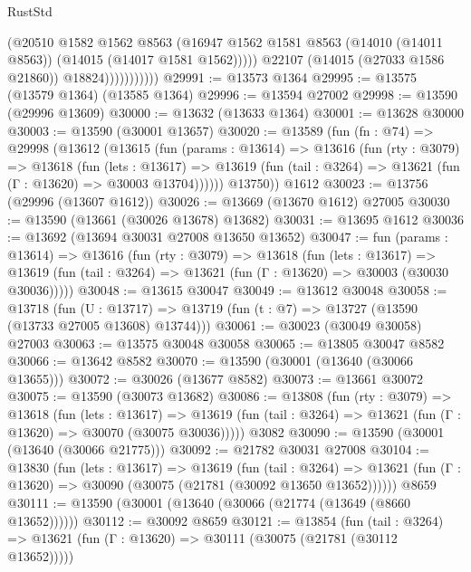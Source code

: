 \begin{lexlean}{RustStd}
\begin{coremodule}
                            (@20510
                              @1582
                              @1562
                              @8563
                              (@16947
                                @1562
                                @1581
                                @8563
                                (@14010 (@14011 @8563))
                                (@14015 (@14017 @1581 @1562)))))
                          @22107
                          (@14015 (@27033 @1586 @21860))
                          @18824)))))))))))
@29991 := @13573 @1364
@29995 := @13575 (@13579 @1364) (@13585 @1364)
@29996 := @13594 @27002
@29998 := @13590 (@29996 @13609)
@30000 := @13632 (@13633 @1364)
@30001 := @13628 @30000
@30003 := @13590 (@30001 @13657)
@30020 := @13589
    (fun (fn : @74) =>
    @29998
      (@13612
        (@13615
          (fun (params : @13614) =>
          @13616
            (fun (rty : @3079) =>
            @13618
              (fun (lets : @13617) =>
              @13619 (fun (tail : @3264) => @13621 (fun (Γ : @13620) => @30003 @13704))))))
        @13750))
    @1612
@30023 := @13756 (@29996 (@13607 @1612))
@30026 := @13669 (@13670 @1612) @27005
@30030 := @13590 (@13661 (@30026 @13678) @13682)
@30031 := @13695 @1612
@30036 := @13692 (@13694 @30031 @27008 @13650 @13652)
@30047 := fun (params : @13614) =>
  @13616
    (fun (rty : @3079) =>
    @13618
      (fun (lets : @13617) =>
      @13619 (fun (tail : @3264) => @13621 (fun (Γ : @13620) => @30003 (@30030 @30036)))))
@30048 := @13615 @30047
@30049 := @13612 @30048
@30058 := @13718
    (fun (U : @13717) => @13719 (fun (t : @7) => @13727 (@13590 (@13733 @27005 @13608) @13744)))
@30061 := @30023 (@30049 @30058) @27003
@30063 := @13575 @30048 @30058
@30065 := @13805 @30047 @8582
@30066 := @13642 @8582
@30070 := @13590 (@30001 (@13640 (@30066 @13655)))
@30072 := @30026 (@13677 @8582)
@30073 := @13661 @30072
@30075 := @13590 (@30073 @13682)
@30086 := @13808
    (fun (rty : @3079) =>
    @13618
      (fun (lets : @13617) =>
      @13619 (fun (tail : @3264) => @13621 (fun (Γ : @13620) => @30070 (@30075 @30036)))))
    @3082
@30090 := @13590 (@30001 (@13640 (@30066 @21775)))
@30092 := @21782 @30031 @27008
@30104 := @13830
    (fun (lets : @13617) =>
    @13619
      (fun (tail : @3264) =>
      @13621 (fun (Γ : @13620) => @30090 (@30075 (@21781 (@30092 @13650 @13652))))))
    @8659
@30111 := @13590 (@30001 (@13640 (@30066 (@21774 (@13649 (@8660 @13652))))))
@30112 := @30092 @8659
@30121 := @13854
    (fun (tail : @3264) => @13621 (fun (Γ : @13620) => @30111 (@30075 (@21781 (@30112 @13652)))))

\end{coremodule}
\end{lexlean}
